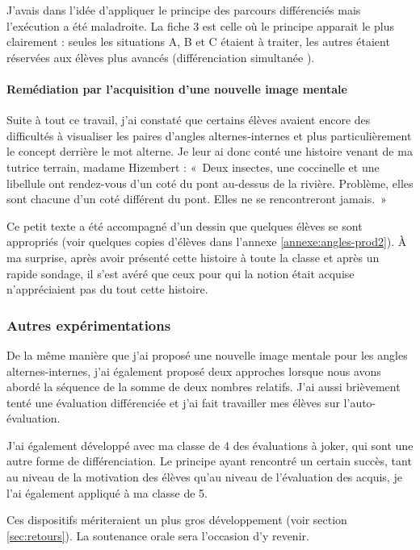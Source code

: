 J'avais dans l'idée d'appliquer le principe des parcours différenciés mais l'exécution a été maladroite. La fiche 3 est celle où le principe apparait le plus clairement : seules les situations A, B et C étaient à traiter, les autres étaient réservées aux élèves plus avancés (différenciation simultanée \cite{Eduscol}).

\paragraph{Remédiation par l'acquisition d'une nouvelle image mentale}

Suite à tout ce travail, j'ai constaté que certains élèves avaient encore des difficultés à visualiser les paires d'angles alternes-internes et plus particulièrement le concept derrière le mot alterne. Je leur ai donc conté une histoire venant de ma tutrice terrain, madame Hizembert : « Deux insectes, une coccinelle et une libellule ont rendez-vous d'un coté du pont au-dessus de la rivière. Problème, elles sont chacune d'un coté différent du pont. Elles ne se rencontreront jamais. »

Ce petit texte a été accompagné d'un dessin que quelques élèves se sont appropriés (voir quelques copies d'élèves dans l'annexe \ref{annexe:angles-prod2}). À ma surprise, après avoir présenté cette histoire à toute la classe et après un rapide sondage, il s'est avéré que ceux pour qui la notion était acquise n'appréciaient pas du tout cette histoire.

\subsubsection{Autres expérimentations}

De la même manière que j'ai proposé une nouvelle image mentale pour les angles alternes-internes, j'ai également proposé deux approches lorsque nous avons abordé la séquence de la somme de deux nombres relatifs. J'ai aussi brièvement tenté une évaluation différenciée et j'ai fait travailler mes élèves sur l'auto-évaluation.

J'ai également développé avec ma classe de 4 des évaluations à joker, qui sont une autre forme de différenciation. Le principe ayant rencontré un certain succès, tant au niveau de la motivation des élèves qu'au niveau de l'évaluation des acquis, je l'ai également appliqué à ma classe de 5.

Ces dispositifs mériteraient un plus gros développement (voir section \ref{sec:retours}). La soutenance orale sera l'occasion d'y revenir.


